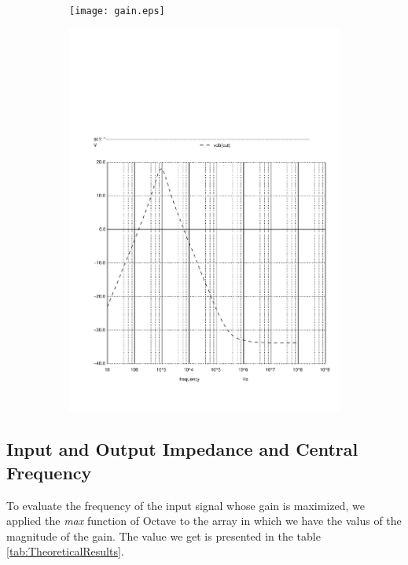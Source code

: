 \begin{figure}[h]
  \centering
  \begin{subfigure}{0.5\textwidth}
    \texttt{[image: gain.eps]}
    \label{fig:argTOct}
  \end{subfigure}
  \begin{subfigure}{0.4\textwidth}
    \includegraphics[width=\linewidth, clip]{gain.pdf}
    \label{fig:argTSpi}
  \end{subfigure}
  \caption{\small }
  \label{}
\end{figure}

\subsection{Input and Output Impedance and Central Frequency}

To evaluate the frequency of the input signal whose gain is maximized, we applied the \textit{max} function of Octave to the array in which
we have the valus of the magnitude of the gain. The value we get is presented in the table \ref*{tab:TheoreticalResults}.

